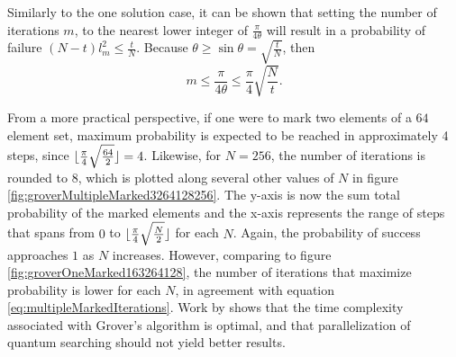 \documentclass[../../dissertation.tex]{subfiles}
\begin{document}
Similarly to the one solution case, it can be shown that setting the number of
iterations $m$, to the nearest lower integer of $\frac{\pi}{4\theta}$ will
result in a probability of failure $(N-t)l^2_m \leq \frac{t}{N}$. Because
$\theta \geq \sin\theta = \sqrt{\frac{t}{N}}$, then
\begin{equation}
	m \leq \frac{\pi}{4\theta} \leq \frac{\pi}{4}\sqrt{\frac{N}{t}}.
	\label{eq:multipleMarkedIterations}
\end{equation}\par
From a more practical perspective, if one were to mark two elements of a $64$
element set, maximum probability is expected to be reached in approximately 4
steps, since $\lfloor\frac{\pi}{4}\sqrt{\frac{64}{2}}\rfloor = 4$. Likewise, for
$N=256$, the number of iterations is rounded to $8$, which is plotted along
several other values of $N$ in figure \ref{fig:groverMultipleMarked3264128256}.
The y-axis is now the sum total probability of the marked elements and the
x-axis represents the range of steps that spans from $0$ to
$\lfloor\frac{\pi}{4}\sqrt{\frac{N}{2}}\rfloor$ for each $N$.
Again, the probability of success approaches $1$ as $N$ increases. However,
comparing to figure \ref{fig:groverOneMarked163264128}, the number of
iterations that maximize probability is lower for each $N$, in agreement with
equation \ref{eq:multipleMarkedIterations}. Work by \cite{zalka1999} shows that
the time complexity associated with Grover's algorithm is optimal, and that
parallelization of quantum searching should not yield better results.
\end{document}
